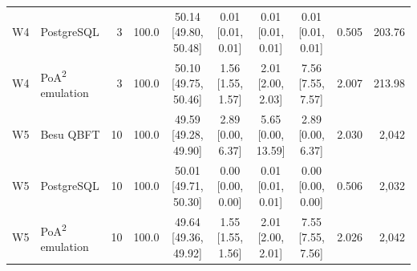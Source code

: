 \begin{table}[t]
{\begin{tabular}{llrrcccccr}
W4 & PostgreSQL & 3 & 100.0 & 50.14 [49.80, 50.48] & 0.01 [0.01, 0.01] & 0.01 [0.01, 0.01] & 0.01 [0.01, 0.01] & 0.505 & 203.76 \\
W4 & PoA\textsuperscript{2} emulation & 3 & 100.0 & 50.10 [49.75, 50.46] & 1.56 [1.55, 1.57] & 2.01 [2.00, 2.03] & 7.56 [7.55, 7.57] & 2.007 & 213.98 \\
W5 & Besu QBFT & 10 & 100.0 & 49.59 [49.28, 49.90] & 2.89 [0.00, 6.37] & 5.65 [0.00, 13.59] & 2.89 [0.00, 6.37] & 2.030 & 2,042 \\
W5 & PostgreSQL & 10 & 100.0 & 50.01 [49.71, 50.30] & 0.00 [0.00, 0.00] & 0.01 [0.01, 0.01] & 0.00 [0.00, 0.00] & 0.506 & 2,032 \\
W5 & PoA\textsuperscript{2} emulation & 10 & 100.0 & 49.64 [49.36, 49.92] & 1.55 [1.55, 1.56] & 2.01 [2.00, 2.01] & 7.55 [7.55, 7.56] & 2.026 & 2,042 \\
\bottomrule
\end{tabular}}
\end{table}
